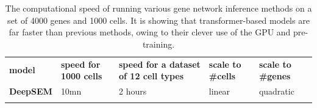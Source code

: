\begin{longtable}[H]{@{}
  >{\raggedright\arraybackslash}p{}
  >{\raggedright\arraybackslash}p{}
  >{\raggedright\arraybackslash}p{}
  >{\raggedright\arraybackslash}p{}
  >{\raggedright\arraybackslash}p{}@{}}
\caption[Computational speed of various GN inference methods]{The computational speed of running various gene network inference methods on a set of 4000 genes and 1000 cells. It is showing that transformer-based models are far faster than previous methods, owing to their clever use of the GPU and pre-training.}\label{tab:s4-computational-speed}\\
\toprule\noalign{}
\begin{minipage}[b]{\linewidth}\centering
\textbf{model}
\end{minipage} & \begin{minipage}[b]{\linewidth}\centering
\textbf{speed for 1000 cells}
\end{minipage} & \begin{minipage}[b]{\linewidth}\centering
\textbf{speed for a dataset of 12 cell types}
\end{minipage} & \begin{minipage}[b]{\linewidth}\raggedright
\textbf{scale to \#cells}
\end{minipage} & \begin{minipage}[b]{\linewidth}\raggedright
\textbf{scale to \#genes}
\end{minipage} \\
\begin{minipage}[b]{\linewidth}\centering
\textbf{DeepSEM}
\end{minipage} & \begin{minipage}[b]{\linewidth}\raggedright
10mn
\end{minipage} & \begin{minipage}[b]{\linewidth}\raggedright
2 hours
\end{minipage} & \begin{minipage}[b]{\linewidth}\raggedright
linear
\end{minipage} & \begin{minipage}[b]{\linewidth}\raggedright
quadratic
\end{minipage} \\
\begin{minipage}[b]{\linewidth}\centering

\end{minipage}
\end{longtable}
